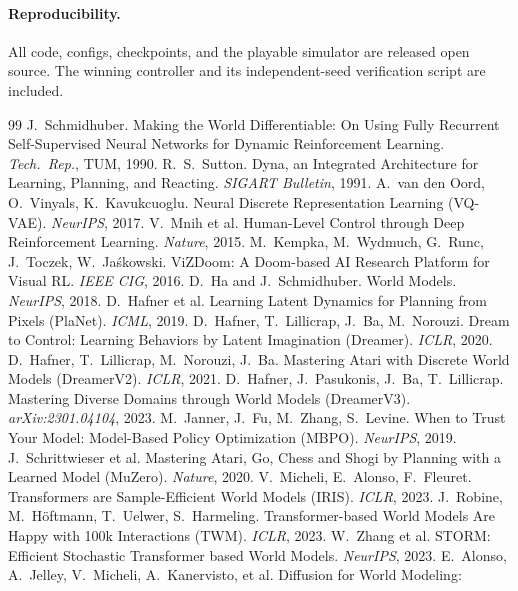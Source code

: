 \documentclass[11pt]{article}
\begin{document}
\paragraph{Reproducibility.} All code, configs, checkpoints, and the playable simulator are released open
source. The winning controller and its independent-seed verification script are included.

\begin{thebibliography}{99}\small
{} J.~Schmidhuber. Making the World Differentiable: On Using Fully Recurrent
Self-Supervised Neural Networks for Dynamic Reinforcement Learning. \emph{Tech.\ Rep.}, TUM, 1990.
 R.~S.~Sutton. Dyna, an Integrated Architecture for Learning, Planning, and Reacting.
\emph{SIGART Bulletin}, 1991.
 A.~van den Oord, O.~Vinyals, K.~Kavukcuoglu. Neural Discrete Representation Learning
(VQ-VAE). \emph{NeurIPS}, 2017.
 V.~Mnih et al. Human-Level Control through Deep Reinforcement Learning. \emph{Nature},
2015.
 M.~Kempka, M.~Wydmuch, G.~Runc, J.~Toczek, W.~Ja\'skowski. ViZDoom: A Doom-based AI
Research Platform for Visual RL. \emph{IEEE CIG}, 2016.
 D.~Ha and J.~Schmidhuber. World Models. \emph{NeurIPS}, 2018.
 D.~Hafner et al. Learning Latent Dynamics for Planning from Pixels (PlaNet).
\emph{ICML}, 2019.
 D.~Hafner, T.~Lillicrap, J.~Ba, M.~Norouzi. Dream to Control: Learning Behaviors by
Latent Imagination (Dreamer). \emph{ICLR}, 2020.
 D.~Hafner, T.~Lillicrap, M.~Norouzi, J.~Ba. Mastering Atari with Discrete World Models
(DreamerV2). \emph{ICLR}, 2021.
 D.~Hafner, J.~Pasukonis, J.~Ba, T.~Lillicrap. Mastering Diverse Domains through World
Models (DreamerV3). \emph{arXiv:2301.04104}, 2023.
 M.~Janner, J.~Fu, M.~Zhang, S.~Levine. When to Trust Your Model: Model-Based Policy
Optimization (MBPO). \emph{NeurIPS}, 2019.
 J.~Schrittwieser et al. Mastering Atari, Go, Chess and Shogi by Planning with a
Learned Model (MuZero). \emph{Nature}, 2020.
 V.~Micheli, E.~Alonso, F.~Fleuret. Transformers are Sample-Efficient World Models
(IRIS). \emph{ICLR}, 2023.
 J.~Robine, M.~H\"oftmann, T.~Uelwer, S.~Harmeling. Transformer-based World Models Are
Happy with 100k Interactions (TWM). \emph{ICLR}, 2023.
 W.~Zhang et al. STORM: Efficient Stochastic Transformer based World Models.
\emph{NeurIPS}, 2023.
 E.~Alonso, A.~Jelley, V.~Micheli, A.~Kanervisto, et al. Diffusion for World Modeling:

\end{thebibliography}
\end{document}
